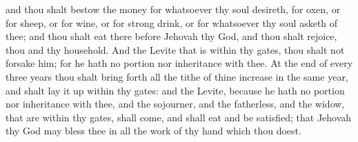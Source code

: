 and thou shalt bestow the money for whatsoever thy soul desireth, for oxen, or for sheep, or for wine, or for strong drink, or for whatsoever thy soul asketh of thee; and thou shalt eat there before Jehovah thy God, and thou shalt rejoice, thou and thy household. And the Levite that is within thy gates, thou shalt not forsake him; for he hath no portion nor inheritance with thee.  At the end of every three years thou shalt bring forth all the tithe of thine increase in the same year, and shalt lay it up within thy gates: and the Levite, because he hath no portion nor inheritance with thee, and the sojourner, and the fatherless, and the widow, that are within thy gates, shall come, and shall eat and be satisfied; that Jehovah thy God may bless thee in all the work of thy hand which thou doest. 

